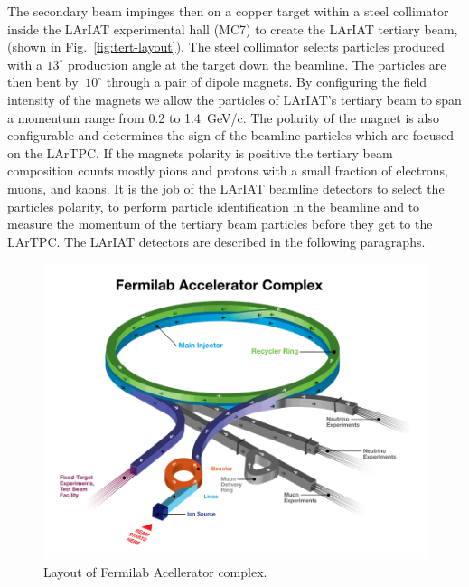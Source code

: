 The secondary beam impinges then on a copper target within a steel collimator inside the LArIAT experimental hall (MC7) to create the LArIAT tertiary beam, (shown in  Fig.~\ref{fig:tert-layout}).   The steel collimator selects particles produced with a $13^\circ$ production angle at the target down the beamline.  The particles are then bent by  $~10^\circ$  through a pair of dipole magnets.  By configuring the field intensity of the magnets we allow the particles of LArIAT's tertiary beam to span a momentum range from 0.2 to 1.4~GeV/c. The polarity of the magnet is also configurable and determines the sign of the beamline particles which are focused on the LArTPC. If the magnets polarity is positive the tertiary beam composition counts mostly pions and protons with a small fraction of electrons, muons, and kaons. It is the job of the LArIAT beamline detectors to select the particles polarity,  to perform particle identification in the beamline and to measure the momentum of the tertiary beam particles before they get to the LArTPC. The LArIAT detectors are described in the following paragraphs.  



\begin{figure}
  \centering  	
\includegraphics[width=\textwidth,height=\textheight,keepaspectratio]{Chapter-3/Images/AcceleratorFNAL.png}
\caption{Layout of Fermilab Acellerator complex.}
\label{fig:Accelerator}
\end{figure}

